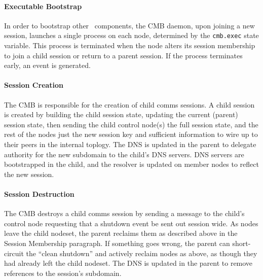\paragraph{Executable Bootstrap}
In order to bootstrap other \ngrm\ components, the CMB daemon, upon
joining a new session, launches a single process on each node,
determined by the {\tt cmb.exec} state variable.
This process is terminated when the node alters its session membership
to join a child session or return to a parent session.
If the process terminates early, an event is generated.


\paragraph{Session Creation}
The CMB is responsible for the creation of
child comms sessions.
A child session is created by building the child session state,
updating the current (parent) session state, then sending the
child control node(s) the full session state, and the rest of the nodes
just the new session key and sufficient information to wire up to their
peers in the internal toplogy.
The DNS is updated in the parent to delegate authority
for the new subdomain to the child's DNS servers.
DNS servers are bootstrapped in the child, and the resolver is updated
on member nodes to reflect the new session.

\paragraph{Session Destruction}
The CMB destroys a child comms session by sending a message to the child's
control node requesting that a shutdown event be sent out session wide.
As nodes leave the child nodeset, the parent reclaims them as described 
above in the Session Membership paragraph.
If something goes wrong, the parent can short-circuit the ``clean shutdown''
and actively reclaim nodes as above, as though they had already left the
child nodeset.
The DNS is updated in the parent to remove references to the session's
subdomain.
